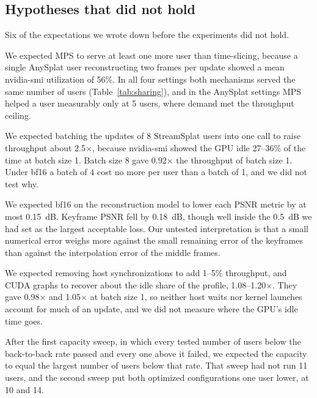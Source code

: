\subsection{Hypotheses that did not hold}

Six of the expectations we wrote down before the experiments did not hold.

We expected MPS to serve at least one more user than time-slicing, because a single AnySplat user reconstructing two frames per update showed a mean nvidia-smi utilization of 56\%. %
In all four settings both mechanisms served the same number of users (Table~\ref{tab:sharing}), and in the AnySplat settings MPS helped a user measurably only at 5 users, where demand met the throughput ceiling. %

We expected batching the updates of 8 StreamSplat users into one call to raise throughput about 2.5$\times$, because nvidia-smi showed the GPU idle 27--36\% of the time at batch size 1. %
Batch size 8 gave 0.92$\times$ the throughput of batch size 1. %
Under bf16 a batch of 4 cost no more per user than a batch of 1, and we did not test why. %

We expected bf16 on the reconstruction model to lower each PSNR metric by at most 0.15~dB. %
Keyframe PSNR fell by 0.18~dB, though well inside the 0.5~dB we had set as the largest acceptable loss. %
Our untested interpretation is that a small numerical error weighs more against the small remaining error of the keyframes than against the interpolation error of the middle frames.

We expected removing host synchronizations to add 1--5\% throughput, and CUDA graphs to recover about the idle share of the profile, 1.08--1.20$\times$. %
They gave 0.98$\times$ and 1.05$\times$ at batch size 1, so neither host waits nor kernel launches account for much of an update, and we did not measure where the GPU's idle time goes. %

After the first capacity sweep, in which every tested number of users below the back-to-back rate passed and every one above it failed, we expected the capacity to equal the largest number of users below that rate. %
That sweep had not run 11 users, and the second sweep put both optimized configurations one user lower, at 10 and 14. %
